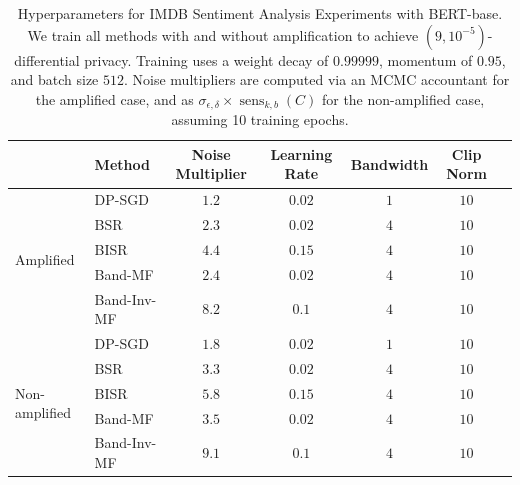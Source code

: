 \documentclass{article} %
\newcommand{\senskb}{\operatorname{sens}_{k, b}}
\begin{document}
\begin{table}[t!]
\caption{Hyperparameters for IMDB Sentiment Analysis Experiments with BERT-base. We train all methods with and without amplification to achieve \((9, 10^{-5})\)-differential privacy. Training uses a weight decay of \(0.99999\), momentum of \(0.95\), and batch size \(512\). Noise multipliers are computed via an MCMC accountant for the amplified case, and as \(\sigma_{\epsilon, \delta} \times \senskb(C)\) for the non-amplified case, assuming 10 training epochs.}

\centering
\renewcommand{\arraystretch}{1} %
\setlength{\tabcolsep}{4pt}      %
\begin{tabular}{llccccc}
\toprule
 & \textbf{Method} & \textbf{Noise Multiplier} & \textbf{Learning Rate}   & \textbf{Bandwidth} & \textbf{Clip Norm}\\ 
\midrule
\multirow{5}{*}{Amplified} &   
DP-SGD & $1.2$ & $0.02$ & $1$  & $10$ \\ 
  & BSR& $2.3$ & $0.02$ & $4$ & $10$ \\ 
 & BISR & $4.4$ & $0.15$ & $4$ & $10$ \\ 
 & Band-MF&  $2.4$ & $0.02$ & $4$ & $10$\\
 & Band-Inv-MF& $8.2$ & $0.1$ & $4$ & $10$ \\
\midrule
\multirow{5}{*}{Non-amplified} &  
DP-SGD & $1.8$ & $0.02$ & $1$  & $10$ \\ 
  & BSR& $3.3$ & $0.02$ & $4$ & $10$ \\ 
 & BISR & $5.8$ & $0.15$ & $4$ & $10$ \\ 
 & Band-MF&  $3.5$ & $0.02$ & $4$ & $10$\\
 & Band-Inv-MF& $9.1$ & $0.1$ & $4$ & $10$ \\
\bottomrule
\end{tabular}
\label{tab:hyperparameters_imdb}
\end{table}
\end{document}
